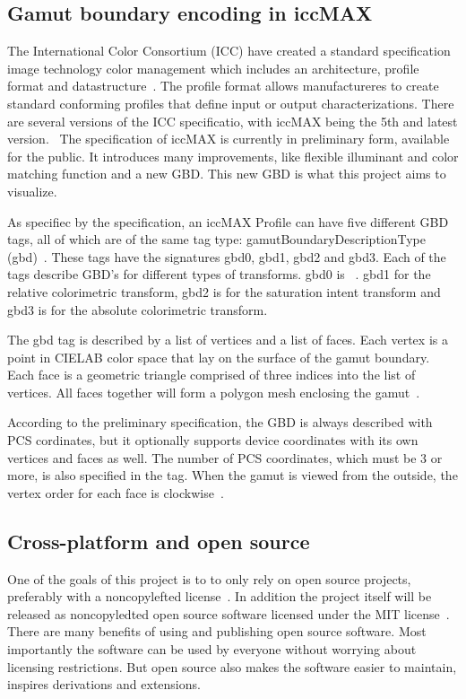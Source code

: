 \subsection{Gamut boundary encoding in iccMAX}
The International Color Consortium (ICC) have created a standard specification image technology color management which includes an architecture, profile format and datastructure~\cite{ColorManagement}.
The profile format allows manufactureres to create standard conforming profiles that define input or output characterizations.
There are several versions of the ICC specificatio, with iccMAX being the 5th and latest version.~\cite{IccMax}
The specification of iccMAX is currently in preliminary form, available for the public.
It introduces many improvements, like flexible illuminant and color matching function and a new GBD.
This new GBD is what this project aims to visualize.

As specifiec by the specification, an iccMAX Profile can have five different GBD tags, all of which are of the same tag type: gamutBoundaryDescriptionType (gbd)~\cite{IccMaxSpec}.
These tags have the signatures gbd0, gbd1, gbd2 and gbd3.
Each of the tags describe GBD's for different types of transforms.
gbd0 is ~\cite{IccMaxSpec}.
gbd1 for the relative colorimetric transform, gbd2 is for the saturation intent transform and gbd3 is for the absolute colorimetric transform.

The gbd tag is described by a list of vertices and a list of faces.
Each vertex is a point in CIELAB color space that lay on the surface of the gamut boundary.
Each face is a geometric triangle comprised of three indices into the list of vertices.
All faces together will form a polygon mesh enclosing the gamut~\cite{BaselineGamut}.

According to the preliminary specification, the GBD is always described with PCS cordinates, but it optionally supports device coordinates with its own vertices and faces as well.
The number of PCS coordinates, which must be 3 or more, is also specified in the tag.
When the gamut is viewed from the outside, the vertex order for each face is clockwise~\cite{IccMaxSpec}.

\subsection{Cross-platform and open source}
\label{sec:crossplatform-open}
One of the goals of this project is to to only rely on open source projects, preferably with a noncopylefted license~\cite{GnuFreeCategories}.
In addition the project itself will be released as noncopyledted open source software licensed under the MIT license~\cite{MitLicense}.
There are many benefits of using and publishing open source software.
Most importantly the software can be used by everyone without worrying about licensing restrictions.
But open source also makes the software easier to maintain, inspires derivations and extensions.

